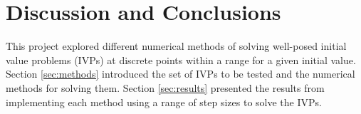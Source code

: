 \documentclass{article}
\begin{document}
%
%
%


\section{Discussion and Conclusions}
\label{sec:conc}

This project explored different numerical methods of solving well-posed initial value problems (IVPs) at discrete points within a range for a given initial value. Section \ref{sec:methods} introduced the set of IVPs to be tested and the numerical methods for solving them. Section \ref{sec:results} presented the results from implementing each method using a range of step sizes to solve the IVPs.
\end{document}
